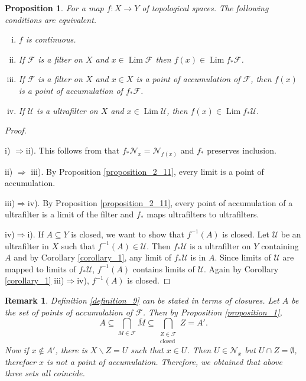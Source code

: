 \documentclass[8pt]{article}
\numberwithin{equation}{section}
\newtheorem{proposition}{Proposition}[subsection]
\newtheorem{remark}{Remark}[subsection]
\DeclareMathOperator{\Lim}{Lim}
\newcommand{\F}[0]{\mathcal{F}}
\newcommand{\U}[0]{\mathcal{U}}
\newcommand{\Nfil}[0]{\mathcal{N}}
\begin{document}
\begin{proposition}
    \label{fact_12}
    For a map $f:X\to Y$ of topological spaces. The following conditions are equivalent.
    \begin{enumerate}[i.]
        \item $f$ is continuous.
        \item If $\F$ is a filter on $X$ and $x\in\Lim\mathcal{F}$ then $f(x)\in\Lim f_*\F$.
        \item If $\F$ is a filter on $X$ and $x\in X$ is a point of accumulation of $\F$, then $f(x)$ is a point of accumulation of $f_*\F$.
        \item If $\mathcal{U}$ is a ultrafilter on $X$ and $x\in\Lim\mathcal{U}$, then $f(x)\in\Lim f_*\mathcal{U}$.
    \end{enumerate}
\end{proposition}
\begin{proof}$\:$
    \par i) $\Rightarrow $ii). This follows from that $f_*\mathcal{N}_x=\mathcal{N}_{f(x)}$ and $f_*$ preserves inclusion.
    \par ii) $\Rightarrow$ iii). By Proposition \ref{proposition_2_11}, every limit is a point of accumulation. 
    \par iii)$\Rightarrow$iv). By Proposition \ref{proposition_2_11}, every point of accumulation of a ultrafilter is a limit of the filter and $f_*$ maps ultrafilters to ultrafilters.
    \par iv)$\Rightarrow$i). If $A\subseteq Y$ is closed, we want to show that $f^{-1}(A)$ is closed. Let $\U$ be an ultrafilter in $X$ such that $f^{-1}(A)\in\U$. Then $f_*\U$ is a ultrafilter on $Y$ containing $A$ and by Corollary \ref{corollary_1}, any limit of $f_*\U$ is in $A$. Since limits of $\U$ are mapped to limits of $f_*\U$, $f^{-1}(A)$ contains limits of $\U$. Again by Corollary \ref{corollary_1} iii)$\Rightarrow$iv), $f^{-1}(A)$ is closed.
\end{proof}
\begin{remark}
    \label{fact_13}
    Definition \ref{definition_9} can be stated in terms of closures.
    Let $A$ be the set of points of accumulation of $\F$. Then by Proposition \ref{proposition_1},
    \begin{equation*}
    A\subseteq \bigcap_{M\in\F}\overline{M} \subseteq \bigcap_{\substack{Z\in\F\\\text{closed}}}Z=A'.
    \end{equation*}
    Now if $x\not\in A'$, there is $X\backslash Z = U$ such that $x\in U$. Then $U\in\Nfil_x$ but $U\cap Z=\emptyset$, therefoer $x$ is not a point of accumulation. Therefore, we obtained that above three sets all coincide.
\end{remark}
\end{document}
